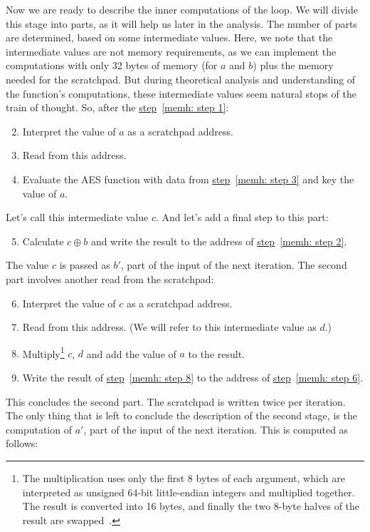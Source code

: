 Now we are ready to describe the inner computations of the loop. We will divide this stage into parts, as it will help us later in the analysis. The number of parts are determined, based on some intermediate values. Here, we note that the intermediate values are not memory requirements, as we can implement the computations with only 32 bytes of memory (for $a$ and $b$) plus the memory needed for the scratchpad. But during theoretical analysis and understanding of the function's computations, these intermediate values seem natural stops of the train of thought. So, after the \hyperref[memh: step 1]{step}~\ref{memh: step 1}:

\begin{enumerate}
  \setcounter{enumi}{1}
  \item \label{memh: step 2} Interpret the value of $a$ as a scratchpad address.
  \item \label{memh: step 3} Read from this address.
  \item Evaluate the AES function with data from \hyperref[memh: step 3]{step}~\ref{memh: step 3} and key the value of $a$.
\end{enumerate}
Let's call this intermediate value $c$. And let's add a final step to this part:
\begin{enumerate}
  \setcounter{enumi}{4}
  \item Calculate $c \oplus b$ and write the result to the address of \hyperref[memh: step 2]{step}~\ref{memh: step 2}.
\end{enumerate}
The value $c$ is passed as $b'$, part of the input of the next iteration. The second part involves another read from the scratchpad:

\begin{enumerate}
  \setcounter{enumi}{5}
  \item \label{memh: step 6} Interpret the value of $c$ as a scratchpad address.
  \item Read from this address. (We will refer to this intermediate value as $d$.)
  \item \label{memh: step 8} Multiply\footnote{The multiplication uses only the first 8 bytes of each argument, which are interpreted as unsigned 64-bit little-endian integers and multiplied together. The result is converted into 16 bytes, and finally the two 8-byte halves of the result are swapped~\cite{cryptonight}.} $c$, $d$ and add the value of $a$ to the result.
  \item Write the result of \hyperref[memh: step 8]{step}~\ref{memh: step 8} to the address of \hyperref[memh: step 6]{step}~\ref{memh: step 6}.
\end{enumerate}
This concludes the second part. The scratchpad is written twice per iteration. The only thing that is left to conclude the description of the second stage, is the computation of $a'$, part of the input of the next iteration. This is computed as follows:

